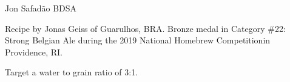 \begin{recipe}{Jon Safadão BDSA}

\begin{aboutblock}
Recipe by Jonas Geiss of Guarulhos, BRA. Bronze medal in Category \#22: Strong
Belgian Ale during the 2019 National Homebrew Competitionin Providence, RI.
\sourceaha
\end{aboutblock}


\begin{methodandtiming}
 
\begin{mashsteps}
\end{mashsteps}

\begin{fermentationsteps}
\end{fermentationsteps}

\begin{directions}
Target a water to grain ratio of 3:1.
\end{directions}

\end{methodandtiming}

\recipebreak

\begin{ingredientsblock}

\begin{malts}
\end{malts}

\begin{hops}
\end{hops}


\end{ingredientsblock}

\end{recipe}
